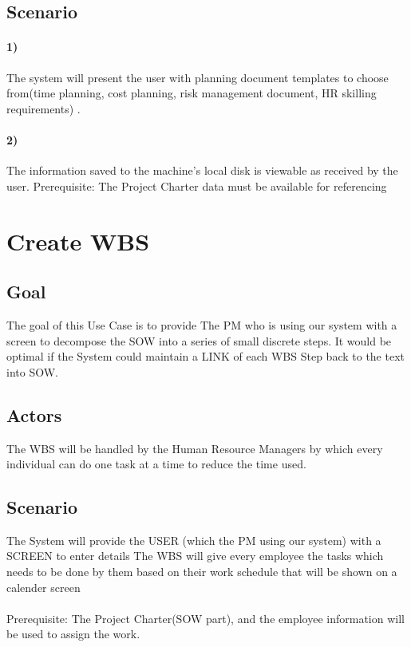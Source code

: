 \documentclass[10pt]{article}
\begin{document}
    \subsection{Scenario}
    \paragraph{1) }The system will present the user with planning document templates to choose from(time planning, cost planning, risk management document, HR skilling requirements) .

    \paragraph{2)} The information saved to the machine’s local disk is viewable as received by the user.
    Prerequisite: The Project Charter data must be available for referencing




\section{Create WBS}

     \subsection{Goal} The goal of this Use Case is to provide The PM who is using our system with a screen to decompose the SOW into a series of small discrete steps. It would be optimal if the System could maintain a LINK of each WBS Step back to the text into SOW.

   \subsection{Actors}  The WBS will be handled by the Human Resource Managers by which every individual can do one task at a time to reduce the time used. 


     \subsection{Scenario} 
The System will provide the USER (which the PM using our system) with a SCREEN to enter details 
The WBS will give every employee the tasks which needs to be done by them based on their work schedule that will be shown on a calender screen


    \paragraph{} Prerequisite: The Project Charter(SOW part), and the employee information will be used to assign the work.
\end{document}
